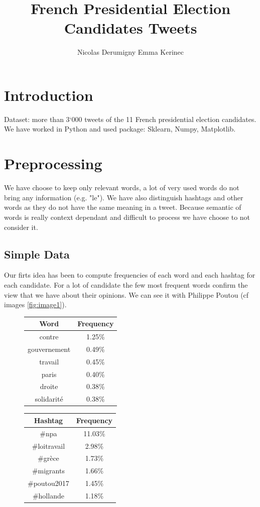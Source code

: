 \documentclass[a4paper]{article}
\title{French Presidential Election Candidates Tweets}
\author{Nicolas Derumigny Emma Kerinec \\ }
\theoremstyle{definition}
\begin{document}
\makeatletter
\begin{titlepage}
\end{titlepage}

\newpage
\section{Introduction}

Dataset: more than 3`000 tweets of the 11 French presidential election candidates.
We have worked in Python and used package: Sklearn, Numpy, Matplotlib.

\section{Preprocessing}
We have choose to keep only relevant words, a lot of very used words do not bring any information (e.g. "le").
We have also distinguish hashtags and other words as they do not have the same meaning in a tweet.
Because semantic of words is really context dependant and difficult to process we have choose to not consider it. 
 
\newpage
\subsection{Simple Data}
Our firts idea has been to compute frequencies of each word and each hashtag for each candidate.
For a lot of candidate the few most frequent words confirm the view that we have about their opinions. 
We can see it with Philippe Poutou (cf images \ref{fig:image1}).


\begin{figure}
\begin{center}
\begin{multicols}{2}
\begin{tabular}{ | c | c |}
\hline Word & Frequency\\
\hline
contre & 1.25\%\\
gouvernement & 0.49\%\\
travail & 0.45\%\\
paris & 0.40\%\\
droite & 0.38\%\\
solidarité &  0.38\%\\
\hline
\end{tabular}

\begin{tabular}{ | c | c |}
\hline Hashtag & Frequency\\
\hline
\#npa & 11.03\%\\
\#loitravail & 2.98\%\\
\#grèce & 1.73\%\\
\#migrants & 1.66\%\\
\#poutou2017 & 1.45\%\\
\#hollande & 1.18\%\\
\hline
\end{tabular}
\end{multicols}
\bigskip
{}
\end{center}
\end{figure}
\end{document}
